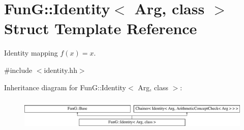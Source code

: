\hypertarget{structFunG_1_1Identity}{\section{Fun\-G\-:\-:Identity$<$ Arg, class $>$ Struct Template Reference}
\label{structFunG_1_1Identity}
}


Identity mapping $ f(x)=x $.  




{\ttfamily \#include $<$identity.\-hh$>$}

Inheritance diagram for Fun\-G\-:\-:Identity$<$ Arg, class $>$\-:\begin{figure}[H]
\begin{center}
\leavevmode
\includegraphics[height=1.525886cm]{structFunG_1_1Identity}
\end{center}
\end{figure}
